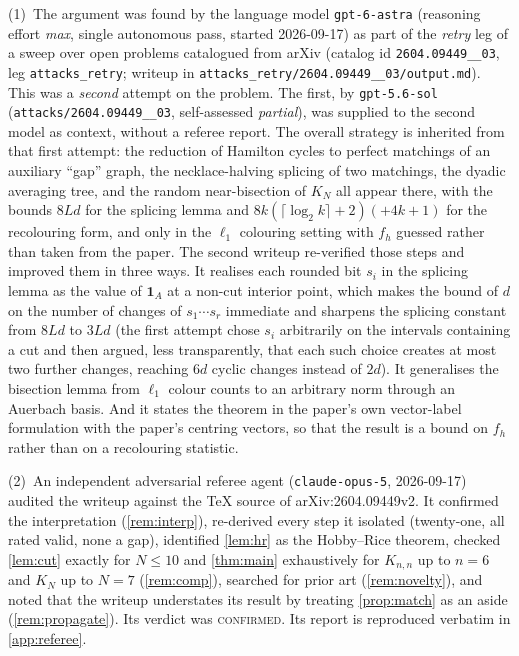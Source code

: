 \documentclass[11pt,a4paper]{article}
\theoremstyle{plain}
\theoremstyle{definition}
\theoremstyle{remark}
\newcommand{\vone}{\mathbf 1}
\begin{document}
(1)~The argument was found by the language model \texttt{gpt-6-astra} (reasoning effort \emph{max}, single autonomous pass, started 2026-09-17) as part of the \emph{retry} leg of a sweep over open problems catalogued from arXiv (catalog id \texttt{2604.09449\_\_03}, leg \texttt{attacks\_retry}; writeup in \nolinkurl{attacks_retry/2604.09449__03/output.md}). This was a \emph{second} attempt on the problem. The first, by \texttt{gpt-5.6-sol} (\texttt{attacks/2604.09449\_\_03}, self-assessed \emph{partial}), was supplied to the second model as context, without a referee report. The overall strategy is inherited from that first attempt: the reduction of Hamilton cycles to perfect matchings of an auxiliary ``gap'' graph, the necklace-halving splicing of two matchings, the dyadic averaging tree, and the random near-bisection of $K_N$ all appear there, with the bounds $8Ld$ for the splicing lemma and $8k(\lceil\log_2k\rceil+2)(+4k+1)$ for the recolouring form, and only in the $\ell_1$ colouring setting with $f_h$ guessed rather than taken from the paper. The second writeup re-verified those steps and improved them in three ways. It realises each rounded bit $s_i$ in the splicing lemma as the value of $\vone_A$ at a non-cut interior point, which makes the bound of $d$ on the number of changes of $s_1\cdots s_r$ immediate and sharpens the splicing constant from $8Ld$ to $3Ld$ (the first attempt chose $s_i$ arbitrarily on the intervals containing a cut and then argued, less transparently, that each such choice creates at most two further changes, reaching $6d$ cyclic changes instead of $2d$). It generalises the bisection lemma from $\ell_1$ colour counts to an arbitrary norm through an Auerbach basis. And it states the theorem in the paper's own vector-label formulation with the paper's centring vectors, so that the result is a bound on $f_h$ rather than on a recolouring statistic.

(2)~An independent adversarial referee agent (\texttt{claude-opus-5}, 2026-09-17) audited the writeup against the TeX source of arXiv:2604.09449v2. It confirmed the interpretation (\cref{rem:interp}), re-derived every step it isolated (twenty-one, all rated valid, none a gap), identified \cref{lem:hr} as the Hobby--Rice theorem, checked \cref{lem:cut} exactly for $N\le10$ and \cref{thm:main} exhaustively for $K_{n,n}$ up to $n=6$ and $K_N$ up to $N=7$ (\cref{rem:comp}), searched for prior art (\cref{rem:novelty}), and noted that the writeup understates its result by treating \cref{prop:match} as an aside (\cref{rem:propagate}). Its verdict was \textsc{confirmed}. Its report is reproduced verbatim in \cref{app:referee}.
\end{document}
